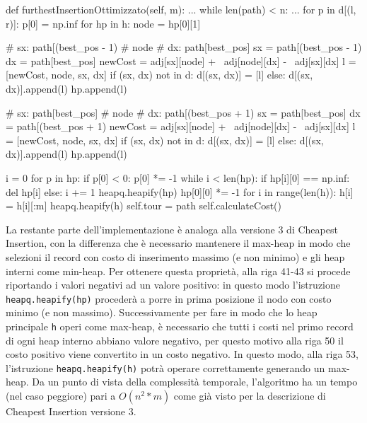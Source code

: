 \documentclass[a4paper,12pt]{report}
\begin{document}
\begin{python}
def furthestInsertionOttimizzato(self, m):
  ...
  while len(path) < n:
    ...
    for p in d[(l, r)]:
      p[0] = np.inf
    for hp in h:
      node = hp[0][1]

      # sx: path[(best_pos - 1) %
      # node
      # dx: path[best_pos]
      sx = path[(best_pos - 1) %
      dx = path[best_pos]
      newCost = adj[sx][node] + \
                adj[node][dx] - \
                adj[sx][dx]
      l = [newCost, node, sx, dx]
      if (sx, dx) not in d:
        d[(sx, dx)] = [l]
      else:
        d[(sx, dx)].append(l)
      hp.append(l)

      # sx: path[best_pos]
      # node
      # dx: path[(best_pos + 1) %
      sx = path[best_pos]
      dx = path[(best_pos + 1) %
      newCost = adj[sx][node] + \
                adj[node][dx] - \
                adj[sx][dx]
      l = [newCost, node, sx, dx]
      if (sx, dx) not in d:
        d[(sx, dx)] = [l]
      else:
        d[(sx, dx)].append(l)
      hp.append(l)

      i = 0
      for p in hp:
        if p[0] < 0:
          p[0] *= -1
      while i < len(hp):
        if hp[i][0] == np.inf:
          del hp[i]
        else:
          i += 1
      heapq.heapify(hp)
      hp[0][0] *= -1
    for i in range(len(h)):
      h[i] = h[i][:m]
    heapq.heapify(h)
  self.tour = path
  self.calculateCost()
\end{python}
La restante parte dell'implementazione è analoga alla versione 3 di Cheapest Insertion, con la differenza che è necessario mantenere il max-heap in modo che selezioni il record con costo di inserimento massimo (e non minimo) e gli heap interni come min-heap. Per ottenere questa proprietà, alla riga 41-43 si procede riportando i valori negativi ad un valore positivo: in questo modo l'istruzione \lstinline!heapq.heapify(hp)! procederà a porre in prima posizione il nodo con costo minimo (e non massimo). Successivamente per fare in modo che lo heap principale \lstinline!h! operi come max-heap, è necessario che tutti i costi nel primo record di ogni heap interno abbiano valore negativo, per questo motivo alla riga 50 il costo positivo viene convertito in un costo negativo. In questo modo, alla riga 53, l'istruzione \lstinline!heapq.heapify(h)! potrà operare correttamente generando un max-heap. \newline
Da un punto di vista della complessità temporale, l'algoritmo ha un tempo (nel caso peggiore) pari a $O(n^2 * m)$ come già visto per la descrizione di Cheapest Insertion versione 3.
\end{document}
